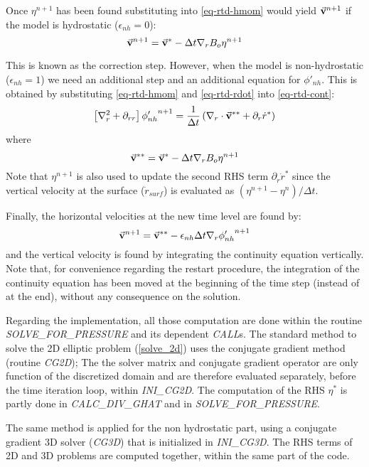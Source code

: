 Once ${\eta}^{n+1}$ has been found substituting into \ref{eq-rtd-hmom}
would yield $\vec{\bf v}^{n+1}$ if the model is hydrostatic
($\epsilon_{nh}=0$):
$$
\vec{\bf v}^{n+1} = \vec{\bf v}^{*}
- \Delta t {\bf \nabla}_r B_o {\eta}^{n+1}
$$

This is known as the correction step. However, when the model is
non-hydrostatic ($\epsilon_{nh}=1$) we need an additional step and an
additional equation for $\phi'_{nh}$. This is obtained by
substituting \ref{eq-rtd-hmom} and \ref{eq-rtd-rdot} into
\ref{eq-rtd-cont}:
\begin{equation}
\left[ {\bf \nabla}_r^2 + \partial_{rr} \right] {\phi'_{nh}}^{n+1}
= \frac{1}{\Delta t} \left(
{\bf \nabla}_r \cdot \vec{\bf v}^{**} + \partial_r \dot{r}^* \right)
\end{equation}
where
\begin{displaymath}
\vec{\bf v}^{**} = \vec{\bf v}^* - \Delta t {\bf \nabla}_r B_o {\eta}^{n+1}
\end{displaymath}
Note that $\eta^{n+1}$ is also used to update the second RHS term
$\partial_r \dot{r}^* $ since
the vertical velocity at the surface ($\dot{r}_{surf}$) 
is evaluated as $(\eta^{n+1} - \eta^n) / \Delta t$.

Finally, the horizontal velocities at the new time level are found by:
\begin{equation}
\vec{\bf v}^{n+1} = \vec{\bf v}^{**}
- \epsilon_{nh} \Delta t {\bf \nabla}_r {\phi'_{nh}}^{n+1}
\end{equation}
and the vertical velocity is found by integrating the continuity
equation vertically.
Note that, for convenience regarding the restart procedure,
the integration of the continuity equation has been 
moved at the beginning of the time step (instead of at the end),
without any consequence on the solution.

Regarding the implementation, all those computation are done
within the routine {\it SOLVE\_FOR\_PRESSURE} and its dependent 
{\it CALL}s.
The standard method to solve the 2D elliptic problem (\ref{solve_2d})
uses the conjugate gradient method (routine {\it CG2D}); The 
the solver matrix and conjugate gradient operator are only function
of the discretized domain and are therefore evaluated separately,
before the time iteration loop, within {\it INI\_CG2D}. 
The computation of the RHS $\eta^*$ is partly 
done in {\it CALC\_DIV\_GHAT} and in {\it SOLVE\_FOR\_PRESSURE}.

The same method is applied for the non hydrostatic part, using
a conjugate gradient 3D solver ({\it CG3D}) that is initialized 
in {\it INI\_CG3D}. The RHS terms of 2D and 3D problems 
are computed together, within the same part of the code.

